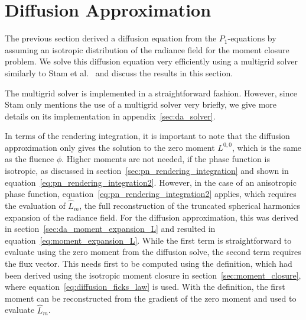 \section{Diffusion Approximation}

\label{sec:diffusion_approximation}

The previous section derived a diffusion equation from the $P_1$-equations by assuming an isotropic distribution of the radiance field for the moment closure problem. We solve this diffusion equation very efficiently using a multigrid solver similarly to Stam et al.~\cite{Stam95} and discuss the results in this section.

The multigrid solver is implemented in a straightforward fashion. However, since Stam only mentions the use of a multigrid solver very briefly, we give more details on its implementation in appendix~\ref{sec:da_solver}.

In terms of the rendering integration, it is important to note that the diffusion approximation only gives the solution to the zero moment $L^{0,0}$, which is the same as the fluence $\phi$. Higher moments are not needed, if the phase function is isotropic, as discussed in section~\ref{sec:pn_rendering_integration} and shown in equation~\ref{eq:pn_rendering_integration2}. However, in the case of an anisotropic phase function, equation~\ref{eq:pn_rendering_integration2} applies, which requires the evaluation of $\widehat{L}_m$, the full reconstruction of the truncated spherical harmonics expansion of the radiance field. For the diffusion approximation, this was derived in section~\ref{sec:da_moment_expansion_L} and resulted in equation~\ref{eq:moment_expansion_L}. While the first term is straightforward to evaluate using the zero moment from the diffusion solve, the second term requires the flux vector. This needs first to be computed using the definition, which had been derived using the isotropic moment closure in section~\ref{sec:moment_closure}, where equation~\ref{eq:diffusion_ficks_law} is used. With the definition, the first moment can be reconstructed from the gradient of the zero moment and used to evaluate $\widehat{L}_m$.

